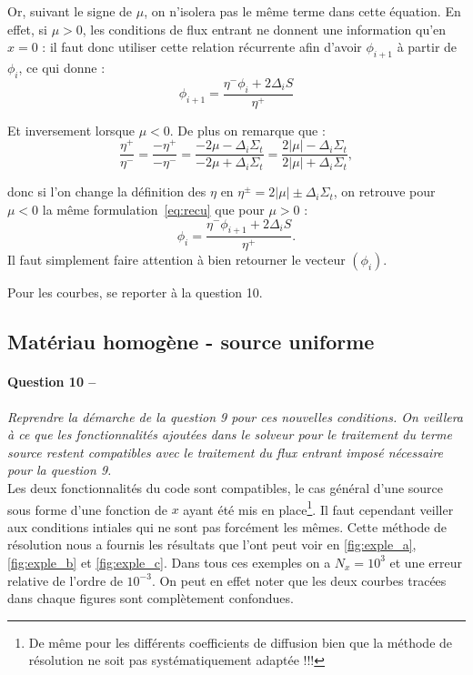 \documentclass[11pt,a4paper]{article}
\newcommand{\question}[2]{\paragraph{Question #1 --}\hspace{-7pt}\textit{#2} \\}
\begin{document}
Or, suivant le signe de $\mu$, on n'isolera pas le même terme dans cette équation.
En effet, si $\mu>0$, les conditions de flux entrant ne donnent une information qu'en $x=0$ : il faut donc utiliser cette relation récurrente afin d'avoir $\phi_{i+1}$ à partir de $\phi_i$, ce qui donne :
\begin{equation}
 \phi_{i+1} = \frac{\eta^- \phi_i + 2 \Delta_i S}{\eta^+}
 \label{eq:recu}
\end{equation}

Et inversement lorsque $\mu<0$.
De plus on remarque que :
\begin{equation}
 \frac{\eta^+}{\eta^-} = \frac{- \eta^+}{-\eta^-} = \frac{-2 \mu - \Delta_i \Sigma_t}{-2 \mu + \Delta_i \Sigma_t} = \frac{2 |\mu| - \Delta_i \Sigma_t}{2 |\mu| + \Delta_i \Sigma_t} ,
\end{equation}

donc si l'on change la définition des $\eta$ en $\eta^{\pm} = 2|\mu| \pm \Delta_i \Sigma_t$, on retrouve pour $\mu<0$ la même formulation~\ref{eq:recu} que pour $\mu>0$ :
\begin{equation}
 \phi_i = \frac{\eta^- \phi_{i+1} + 2 \Delta_i S}{\eta^+} .
\end{equation}
Il faut simplement faire attention à bien retourner le vecteur $(\phi_i)$.

Pour les courbes, se reporter à la question 10.
\subsection{Matériau homogène - source uniforme}

\question{10}{Reprendre la démarche de la question 9 pour ces nouvelles conditions. On veillera à ce que les fonctionnalités
 ajoutées dans le solveur pour le traitement du terme source restent compatibles avec le traitement du flux entrant imposé nécessaire pour la question 9.}

Les deux fonctionnalités du code sont compatibles, le cas général d'une source sous forme d'une fonction de $x$ ayant été mis en place\footnote{De même pour les différents coefficients de diffusion bien que la méthode de résolution ne soit pas systématiquement adaptée !!!}. Il faut cependant veiller aux conditions intiales qui ne sont pas forcément les mêmes. Cette méthode de résolution nous a fournis les résultats que l'ont peut voir en \autoref{fig:exple_a}, \autoref{fig:exple_b} et \autoref{fig:exple_c}. Dans tous ces exemples on a $N_x=10^{3}$ et une erreur relative de l'ordre de $10^{-3}$. On peut en effet noter que les deux courbes tracées dans chaque figures sont complètement confondues. 
\end{document}
